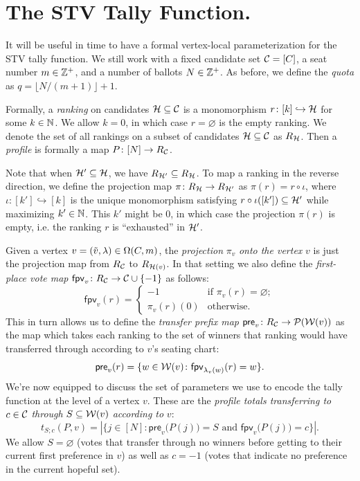 \appendix

\newcommand{\fpv}{\mathsf{fpv}}
\newcommand{\pre}{\mathsf{pre}}

\newcommand{\PPP}{\mathcal{P}}

\section{The STV Tally Function.}\label{sec:appendix}
It will be useful in time to have a formal vertex-local parameterization for the STV tally function. We still work with a fixed candidate set $\mathcal{C} = [C]$, a seat number $m\in\mathbb{Z}^+$, and a number of ballots $N\in\mathbb{Z}^+$.
As before, we define the \emph{quota} as $q = \lfloor N/(m+1)\rfloor +1$. 

Formally, a \emph{ranking} on candidates $\mathcal{H}\subseteq \mathcal{C}$ is a monomorphism $r\colon [k]\hookrightarrow \mathcal{H}$ for some $k\in \mathbb{N}$. We allow $k=0$, in which case $r=\varnothing$ is the empty ranking. 
We denote the set of all rankings on a subset of candidates $\mathcal{H}\subseteq \mathcal{C}$ as $R_{\mathcal{H}}$. Then a \emph{profile} is formally a map $P\colon [N]\to R_{\mathcal{C}}$.

Note that when $\mathcal{H}'\subseteq \mathcal{H}$, we have $R_{\mathcal{H}'}\subseteq R_{\mathcal{H}}$. To map a ranking in the reverse direction, we define the projection map $\pi\colon R_{\mathcal{H}}\to R_{\mathcal{H}'}$ as $\pi(r)= r\circ \iota$, where $\iota\colon [k']\hookrightarrow [k]$ is the unique monomorphism satisfying $r\circ\iota([k'])\subseteq \mathcal{H}'$ while maximizing $k'\in\mathbb{N}$. This $k'$ might be $0$, in which case the projection $\pi(r)$ is empty, i.e. the ranking $r$ is ``exhausted'' in $\mathcal{H}'$.

Given a vertex $v = (\tilde{v}, \lambda)\in\Omega(C, m)$, the \emph{projection} $\pi_v$ \emph{onto the vertex} $v$ is just the projection map from $R_{\mathcal{C}}$ to $R_{\mathcal{H}(v)}$. In that setting we also define the \emph{first-place vote map} $\fpv_v \colon R_{\CCC}\to \CCC\cup\{-1\}$ as follows:
\[
	\fpv_v(r)=\begin{cases}
		-1 & \text{if } \pi_v(r)=\varnothing;\\
		\pi_v(r)(0) & \text{otherwise.}
	\end{cases}
\]
This in turn allows us to define the \emph{transfer prefix map} $\pre_v\colon R_{\CCC}\to \PPP(\WWW(v))$ as the map which takes each ranking to the set of winners that ranking would have transferred through according to $v$'s seating chart:
\[
	\pre_v(r) = \{w\in\WWW(v)\colon \fpv_{\lambda_v(w)}(r)=w\}.
\]
We're now equipped to discuss the set of parameters we use to encode the tally function at the level of a vertex $v$. These are the \emph{profile totals transferring to} $c\in\mathcal{C}$ \emph{through} $S\subseteq \mathcal{W}(v)$ \emph{according to} $v$:
\begin{equation}
	t_{S;c}(P, v) = |\{j\in [N]\colon \pre_v\big(P(j)\big)=S \text{ and } \fpv_v\big(P(j)\big)=c\}|.
	\label{eq:parameters}
\end{equation}
We allow $S=\varnothing$ (votes that transfer through no winners before getting to their current first preference in $v$) as well as $c=-1$ (votes that indicate no preference in the current hopeful set).

